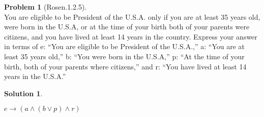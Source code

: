 \documentclass{article}
\theoremstyle{definition}
\newtheorem*{problem}{Problem}
\newtheorem*{solution}{Solution}
\begin{document}
\begin{problem}[Rosen.1.2.5]\ \\
You are eligible to be President of the U.S.A. only if you
are at least 35 years old, were born in the U.S.A, or at the
time of your birth both of your parents were citizens, and
you have lived at least 14 years in the country. Express
your answer in terms of e: “You are eligible to be President
of the U.S.A.,” a: “You are at least 35 years old,”
b: “You were born in the U.S.A,” p: “At the time of your
birth, both of your parents where citizens,” and r: “You
have lived at least 14 years in the U.S.A.”
\begin{compactenum}
\renewcommand{\theenumi}{\alph{enumi}}

\end{compactenum}
\end{problem}

\begin{solution}\ \\
\begin{compactenum}
\renewcommand{\theenumi}{\alph{enumi}}
$e \rightarrow (a \wedge (b \vee p) \wedge r)$
\end{compactenum}
\end{solution}
\end{document}
